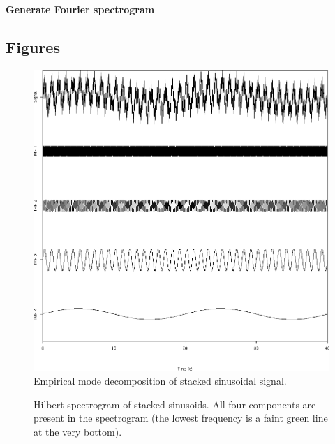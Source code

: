 \documentclass[12pt]{article}
\begin{document}
\textbf{Generate Fourier spectrogram}

\begin{Schunk}
\end{Schunk}

\FloatBarrier

\subsection{Figures}

\begin{figure}[h]
\begin{center}
\includegraphics[width=1\textwidth]{stacked1imfs.png}
\end{center}
\caption{Empirical mode decomposition of stacked sinusoidal signal.}
\label{fig:stacked1imfs}
\end{figure}

\begin{figure}[h]
\begin{center}
\end{center}
\caption{Hilbert spectrogram of stacked sinusoids.  All four components are present in the spectrogram (the lowest frequency is a faint green line at the very bottom).}
\label{fig:stacked1farhspec}
\end{figure}
\end{document}
